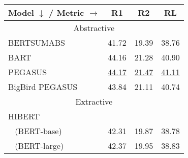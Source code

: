 \documentclass[11pt]{article}
\begin{document}
\begin{table}[ht]
\fontsize{9}{9}
\selectfont
\centering
        \begin{tabular}[t]{@{}llll@{}}
        \toprule
         Model $\downarrow$ / Metric $\rightarrow$  & \multicolumn{1}{c}{R1} & \multicolumn{1}{c}{R2} & \multicolumn{1}{c}{RL} \\ \midrule
        \multicolumn{4}{c}{Abstractive}                 \\ \midrule
BERTSUMABS \citeyearpar{presumm}              & 41.72 & 19.39 & 38.76 \\
BART \citeyearpar{bart}                    & 44.16 & 21.28 & 40.90 \\
PEGASUS \citeyearpar{zhang2019pegasus}                 & \underline{44.17} & \underline{21.47} & \underline{41.11} \\
BigBird PEGASUS \citeyearpar{bigbird}         & 43.84 & 21.11 & 40.74 \\ \midrule
        \multicolumn{4}{c}{Extractive}                  \\ \midrule
HIBERT \citeyearpar{zhang-etal-2019-hibert}    &  &  & \\
~ (BERT-base)  & 42.31 & 19.87 & 38.78 \\
~ (BERT-large) & 42.37 & 19.95 & 38.83 \\


\end{tabular}
\end{table}
\end{document}
